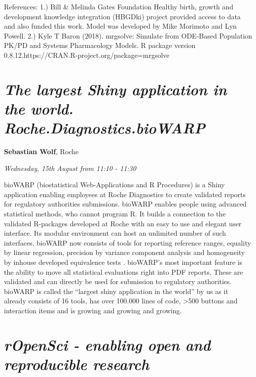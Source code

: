 \documentclass[]{book}
\theoremstyle{definition}
\theoremstyle{definition}
\theoremstyle{definition}
\theoremstyle{remark}
\begin{document}
References: 1.) Bill \& Melinda Gates Foundation Healthy birth, growth
and development knowledge integration (HBGDki) project provided access
to data and also funded this work. Model was developed by Mike Morimoto
and Lyn Powell. 2.) Kyle T Baron (2018). mrgsolve: Simulate from
ODE-Based Population PK/PD and Systems Pharmacology Models. R package
version 0.8.12.https://CRAN.R-project.org/package=mrgsolve

\hypertarget{the-largest-shiny-application-in-the-world.-roche.diagnostics.biowarp}{%
\section{\texorpdfstring{\emph{The largest Shiny application in the
world.
Roche.Diagnostics.bioWARP}}{The largest Shiny application in the world. Roche.Diagnostics.bioWARP}}\label{the-largest-shiny-application-in-the-world.-roche.diagnostics.biowarp}}

\textbf{Sebastian Wolf}, Roche

\emph{Wednesday, 15th August from 11:10 - 11:30}

bioWARP (biostatistical Web-Applications and R Procedures) is a Shiny
application enabling employees at Roche Diagnostics to create validated
reports for regulatory authorities submissions. bioWARP enables people
using advanced statistical methods, who cannot program R. It builds a
connection to the validated R-packages developed at Roche with an easy
to use and elegant user interface. Its modular environment can host an
unlimited number of such interfaces. bioWARP now consists of tools for
reporting reference ranges, equality by linear regression, precision by
variance component analysis and homogeneity by inhouse developed
equivalence tests . bioWARP's most important feature is the ability to
move all statistical evaluations right into PDF reports. These are
validated and can directly be used for submission to regulatory
authorities. bioWARP is called the ``largest shiny application in the
world'' by us as it already consists of 16 tools, has over 100.000 lines
of code, \textgreater{}500 buttons and interaction items and is growing
and growing and growing.

\hypertarget{ropensci---enabling-open-and-reproducible-research}{%
\section{\texorpdfstring{\emph{rOpenSci - enabling open and reproducible
research}}{rOpenSci - enabling open and reproducible research}}\label{ropensci---enabling-open-and-reproducible-research}}
\end{document}
